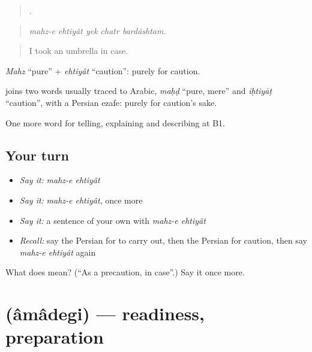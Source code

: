 \begin{quote}
    .
\end{quote}

\begin{quote}
\emph{mahz-e ehtiyât yek chatr bardâshtam.}
\end{quote}

\begin{quote}
I took an umbrella in case.
\end{quote}

\emph{Mahz} \textquotedblleft{}pure\textquotedblright{} + \emph{ehtiyât} \textquotedblleft{}caution\textquotedblright{}: purely for caution.

\begin{cousinweb}
\textbf{ } joins two words usually traced to Arabic, \emph{maḥḍ} \textquotedblleft{}pure, mere\textquotedblright{} and \emph{iḥtiyāṭ} \textquotedblleft{}caution\textquotedblright{}, with a Persian ezafe: purely for caution's sake.
\end{cousinweb}

\begin{grammarlens}[title={What you've built}]
One more word for telling, explaining and describing at B1.
\end{grammarlens}

\subsection*{Your turn}
\begin{itemize}
\raggedright
  \item \emph{Say it:} \emph{mahz-e ehtiyât}
  \item \emph{Say it:} \emph{mahz-e ehtiyât}, once more
  \item \emph{Say it:} a sentence of your own with \emph{mahz-e ehtiyât}
  \item \emph{Recall:} say the Persian for to carry out, then the Persian for caution, then say \emph{mahz-e ehtiyât} again
\end{itemize}

\begin{tcolorbox}[breakable,colback=teal!4,colframe=teal!35!black,title={Before you move on}]
What does   mean? (\textquotedblleft{}As a precaution, in case\textquotedblright{}.) Say it once more.
\end{tcolorbox}
\section[\texorpdfstring{\fa{آمادگی} (âmâdegi)}{آمادگی (âmâdegi)}]{ (âmâdegi) — readiness, preparation}

